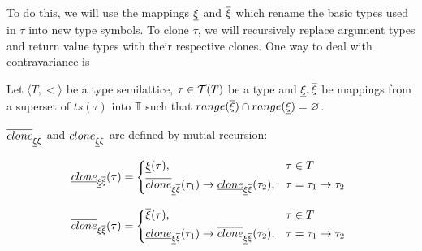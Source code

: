 \documentclass[main.tex]{subfiles}
\begin{document}
To do this, we will use the mappings $\underline{\xi}$ and $\overline{\xi}$
which rename the basic types used in $\tau$ into new type symbols. To clone
$\tau$, we will recursively replace argument types and return value types
with their respective clones. One way to deal with contravariance is

\newcommand\clonesub{\subtyper{clone}_{\subtyper{\xi} \suptyper{\xi}}}
\newcommand\clonesup{\suptyper{clone}_{\subtyper{\xi} \suptyper{\xi}}}

\begin{defn}
    Let $\langle T, \less \rangle$ be a type semilattice, $\tau \in \mathcal{T}( T )$
    be a type and $\underline{\xi}, \overline{\xi}$ be mappings from a
    superset of
    $ts(\tau)$ into $\mathbb{T}$ such that
    $range(\overline{\xi}) \cap range(\underline{\xi}) = \varnothing$.

    $\overline{clone}_{\underline{\xi} \overline{\xi}}$ and
    $\underline{clone}_{\underline{\xi} \overline{\xi}}$ are defined by
    mutial recursion:

    \[
        \subtyper{clone}_{\subtyper{\xi} \suptyper{\xi}}(\tau) =
        \begin{cases*}
            \subtyper{\xi}(\tau), &
                $\tau \in T$ \\
            \suptyper{clone}_{\subtyper{\xi} \suptyper{\xi}}(\tau_1)
                \tot \subtyper{clone}_{\subtyper{\xi} \suptyper{\xi}}(\tau_2), &
                $\tau = \tau_1 \tot \tau_2$ \\
        \end{cases*}
    \]

    \[
        \suptyper{clone}_{\subtyper{\xi} \suptyper{\xi}}(\tau) =
        \begin{cases*}
            \suptyper{\xi}(\tau), &
                $\tau \in T$ \\
            \subtyper{clone}_{\subtyper{\xi} \suptyper{\xi}}(\tau_1)
                \tot \suptyper{clone}_{\subtyper{\xi} \suptyper{\xi}}(\tau_2), &
                $\tau = \tau_1 \tot \tau_2$ \\
        \end{cases*}
    \]

\end{defn}
\end{document}
